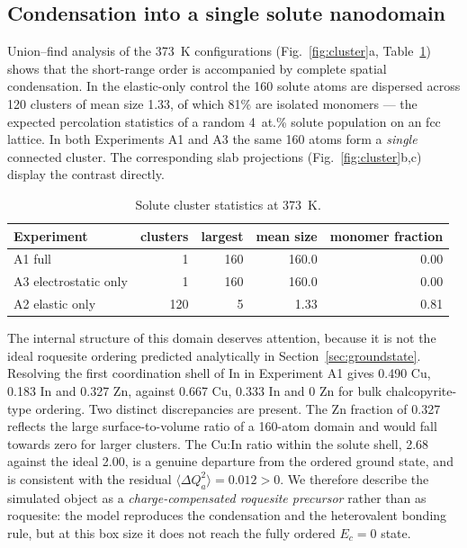 \documentclass[11pt,a4paper]{article}
\newcommand{\dQ}{\Delta Q}
\begin{document}
\subsection{Condensation into a single solute nanodomain}
\label{sec:clusters}

Union--find analysis of the 373~K configurations (Fig.~\ref{fig:cluster}a,
Table~\ref{tab:clusters}) shows that the short-range order is accompanied by
complete spatial condensation. In the elastic-only control the 160 solute atoms
are dispersed across 120 clusters of mean size 1.33, of which 81\% are isolated
monomers --- the expected percolation statistics of a random 4~at.\% solute
population on an fcc lattice. In both Experiments A1 and A3 the same 160 atoms
form a \emph{single} connected cluster. The corresponding slab projections
(Fig.~\ref{fig:cluster}b,c) display the contrast directly.

\begin{table}[htbp]
\centering
\caption{Solute cluster statistics at 373~K.}
\label{tab:clusters}
\small
\begin{tabular}{lrrrr}
\toprule
Experiment & clusters & largest & mean size & monomer fraction \\
\midrule
A1 full & 1 & 160 & 160.0 & 0.00 \\
A3 electrostatic only & 1 & 160 & 160.0 & 0.00 \\
A2 elastic only & 120 & 5 & 1.33 & 0.81 \\
\bottomrule
\end{tabular}
\end{table}

The internal structure of this domain deserves attention, because it is not the
ideal roquesite ordering predicted analytically in
Section~\ref{sec:groundstate}. Resolving the first coordination shell of In in
Experiment A1 gives 0.490 Cu, 0.183 In and 0.327 Zn, against 0.667 Cu, 0.333 In
and 0 Zn for bulk chalcopyrite-type ordering. Two distinct discrepancies are
present. The Zn fraction of 0.327 reflects the large surface-to-volume ratio of
a 160-atom domain and would fall towards zero for larger clusters. The Cu:In
ratio within the solute shell, 2.68 against the ideal 2.00, is a genuine
departure from the ordered ground state, and is consistent with the residual
$\langle \dQ_a^2\rangle = 0.012 > 0$. We therefore describe the simulated object
as a \emph{charge-compensated roquesite precursor} rather than as roquesite: the
model reproduces the condensation and the heterovalent bonding rule, but at this
box size it does not reach the fully ordered $E_c = 0$ state.
\end{document}
